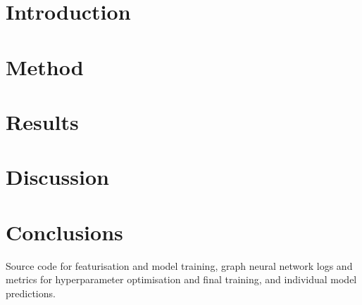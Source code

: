 \documentclass[journal=jcisd8,manuscript=article]{achemso}
\begin{document}
\section{Introduction}



\section{Method}



\section{Results}



\section{Discussion}



\section{Conclusions}





\begin{suppinfo}

    Source code for featurisation and model training, graph neural network logs
    and metrics for hyperparameter optimisation and final training, and
    individual model predictions.

\end{suppinfo}


\end{document}
